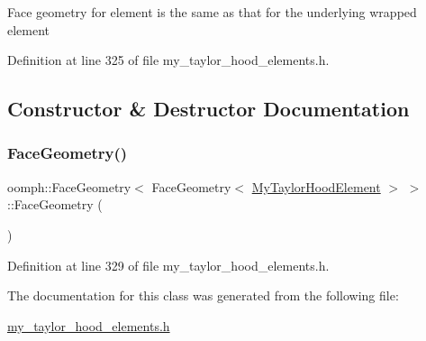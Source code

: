 Face geometry for element is the same as that for the underlying wrapped element 

Definition at line 325 of file my\+\_\+taylor\+\_\+hood\+\_\+elements.\+h.



\subsection{Constructor \& Destructor Documentation}
\mbox{\label{classoomph_1_1FaceGeometry_3_01FaceGeometry_3_01MyTaylorHoodElement_01_4_01_4_a35f1bde1f3b3cc7c29d417cd75f0ef86}} 
\subsubsection{\texorpdfstring{Face\+Geometry()}{FaceGeometry()}}
{\footnotesize\ttfamily oomph\+::\+Face\+Geometry$<$ Face\+Geometry$<$ \hyperlink{classoomph_1_1MyTaylorHoodElement}{My\+Taylor\+Hood\+Element} $>$ $>$\+::Face\+Geometry (\begin{DoxyParamCaption}{ }\end{DoxyParamCaption})\hspace{0.3cm}{\ttfamily [inline]}}



Definition at line 329 of file my\+\_\+taylor\+\_\+hood\+\_\+elements.\+h.



The documentation for this class was generated from the following file\+:\begin{DoxyCompactItemize}
\item 
\hyperlink{my__taylor__hood__elements_8h}{my\+\_\+taylor\+\_\+hood\+\_\+elements.\+h}\end{DoxyCompactItemize}

